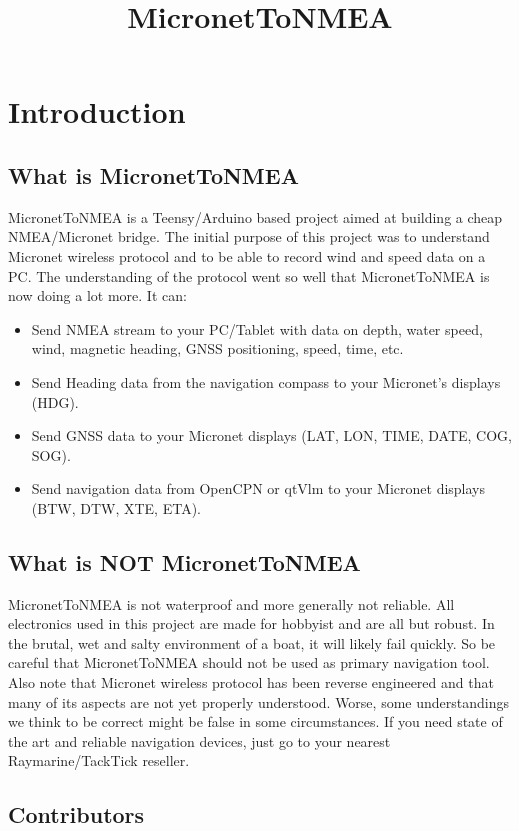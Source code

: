 \documentclass{report}
\begin{document}
\title{MicronetToNMEA}

\chapter {Introduction}

\section{What is MicronetToNMEA}

MicronetToNMEA is a Teensy/Arduino based project aimed at building a cheap NMEA/Micronet bridge. The initial purpose of this project was to understand Micronet wireless protocol and to be able to record wind and speed data on a PC. The understanding of the protocol went so well that MicronetToNMEA is now doing a lot more. It can:

\begin{itemize}
\item Send NMEA stream to your PC/Tablet with data on depth, water speed, wind, magnetic heading, GNSS positioning, speed, time, etc.
\item Send Heading data from the navigation compass to your Micronet's displays (HDG).
\item Send GNSS data to your Micronet displays (LAT, LON, TIME, DATE, COG, SOG).
\item Send navigation data from OpenCPN or qtVlm to your Micronet displays (BTW, DTW, XTE, ETA).
\end{itemize}

\section{What is NOT MicronetToNMEA}

MicronetToNMEA is not waterproof and more generally not reliable. All electronics used in this project are made for hobbyist and are all but robust. In the brutal, wet and salty environment of a boat, it will likely fail quickly. So be careful that MicronetToNMEA should not be used as primary navigation tool. Also note that Micronet wireless protocol has been reverse engineered and that many of its aspects are not yet properly understood. Worse, some understandings we think to be correct might be false in some circumstances. If you need state of the art and reliable navigation devices, just go to your nearest Raymarine/TackTick reseller.

\section{Contributors}
\end{document}
